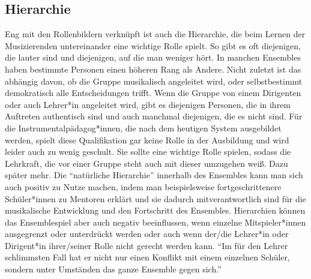 \subsection{Hierarchie}
Eng mit den Rollenbildern verknüpft ist auch die Hierarchie, die beim Lernen der
Musizierenden untereinander eine wichtige Rolle spielt. So gibt es oft
diejenigen, die lauter sind und diejenigen, auf die man weniger hört. In manchen
Ensembles haben bestimmte Personen einen höheren Rang als Andere. Nicht zuletzt
ist das abhängig davon, ob die Gruppe musikalisch angeleitet wird, oder
selbstbestimmt demokratisch alle Entscheidungen trifft. Wenn die Gruppe von
einem Dirigenten oder auch Lehrer*in angeleitet wird, gibt es diejenigen
Personen, die in ihrem Auftreten authentisch sind und auch manchmal diejenigen,
die es nicht sind. Für die Instrumentalpädagog*innen, die nach dem heutigen
System ausgebildet werden, spielt diese Qualifikation gar keine Rolle in der
Ausbildung und wird leider auch zu wenig geschult. Sie sollte eine wichtige
Rolle spielen, sodass die Lehrkraft, die vor einer Gruppe steht auch mit dieser
umzugehen weiß. Dazu später mehr. Die \enquote{natürliche Hierarchie} innerhalb
des Ensembles kann man sich auch positiv zu Nutze machen, indem man
beispielsweise fortgeschrittenere Schüler*innen zu Mentoren erklärt und sie
dadurch mitverantwortlich sind für die musikalische Entwicklung und den
Fortschritt des Ensembles.\autocite[95]{doerne:umfassend_musizieren} Hierarchien
können das Ensemblespiel aber auch negativ beeinflussen, wenn einzelne
Mitspieler*innen ausgegrenzt oder unterdrückt werden oder auch wenn der/die
Lehrer*in oder Dirigent*in ihrer/seiner Rolle nicht gerecht werden kann.
\enquote{Im für den Lehrer schlimmsten Fall hat er nicht nur einen Konflikt mit
einem einzelnen Schüler, sondern unter Umständen das ganze Ensemble gegen
sich.}\autocite[94]{mitzscherlich:musikpsychologie}


